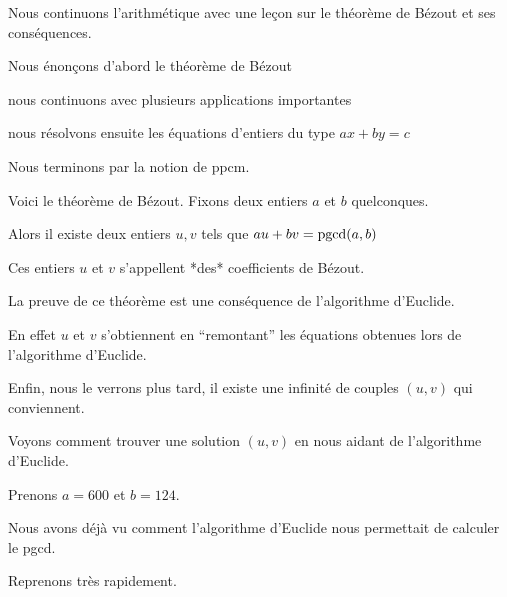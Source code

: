 





\debuttexte



\diapo

\change

Nous continuons l'arithmétique avec une leçon sur le théorème de Bézout et
ses conséquences.

\change

Nous énonçons d'abord le théorème de Bézout

\change

nous continuons avec plusieurs applications importantes

\change 

nous résolvons ensuite les équations d'entiers du type
$ax+by=c$

\change

Nous terminons par la notion de ppcm.

\diapo

Voici le théorème de Bézout. Fixons deux entiers $a$ et $b$ quelconques.

Alors il existe deux entiers $u,v$  tels que 
$au+bv=\mathop{\mathrm{pgcd}}\nolimits(a,b)$

\change

Ces entiers $u$ et $v$ s'appellent *des* coefficients de Bézout.

La preuve de ce théorème est une conséquence de l'algorithme d'Euclide.

En effet $u$ et $v$ s'obtiennent en ``remontant'' les équations obtenues
lors de l'algorithme d'Euclide.

Enfin, nous le verrons plus tard, il existe une infinité de couples $(u,v)$ qui conviennent.


\diapo

Voyons comment trouver une solution $(u,v)$ en nous aidant de l'algorithme d'Euclide.

Prenons $a=600$ et $b=124$.

\change

Nous avons déjà vu comment l'algorithme d'Euclide nous permettait de calculer le pgcd.

Reprenons très rapidement. 

